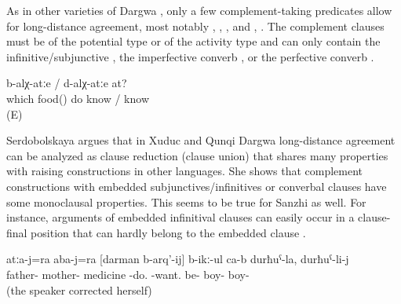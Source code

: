 As in other varieties of Dargwa \citep{Serdobolskaya2010}, only a few complement-taking predicates allow for long-distance agreement, most notably  ,  ,  , and  , . The complement clauses must be of the potential type or of the activity type and can only contain the infinitive\slash subjunctive , the imperfective converb , or the perfective converb . 
%
\begin{exe}
	\ex	\label{ex:‎Which food do you know to cook}
		b-alχ-atːe	/	d-alχ-atːe	at?\\
		which	food()	do	know	/	know	\\
	\glt	{} (E)
\end{exe}

Serdobolskaya \citeyearpar{Serdobolskaya2010, Serdobolskaya2009} argues that in Xuduc and Qunqi Dargwa long-distance agreement can be analyzed as clause reduction (clause union) that shares many properties with raising constructions in other languages. She shows that complement constructions with embedded subjunctives/infinitives or converbal clauses have some monoclausal properties. This seems to be true for Sanzhi as well. For instance, arguments of embedded infinitival clauses can easily occur in a clause-final position that can hardly belong to the embedded clause .

\begin{exe}
	\ex	\label{ex:The father and the mother want to give medicine of the son, to the son.}
	\gll	atːa-j=ra	aba-j=ra	[darman	b-arq'-ij]	b-ikː-ul	ca-b	durħuˁ-la,		durħuˁ-li-j\\
		father-	mother-	medicine	\tsc{n}-do.	-want.	be-	boy-	boy-\\
	\glt	{} (the speaker corrected herself)
\end{exe}

